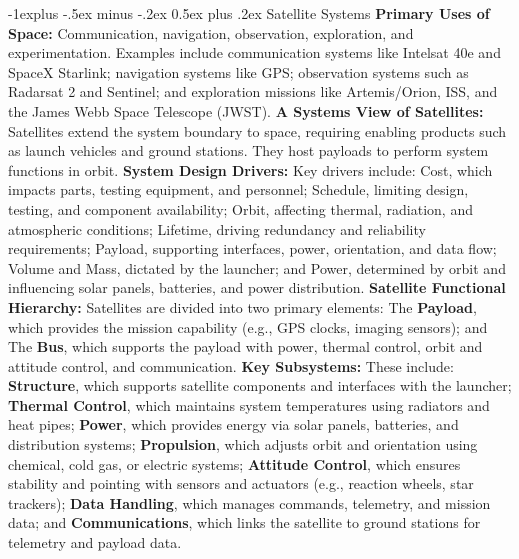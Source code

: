 \documentclass[letterpaper, 8pt]{extarticle}
\makeatletter
\renewcommand{\section}{\@startsection{section}{1}{0mm}%
                                {-1explus -.5ex minus -.2ex}%
                                {0.5ex plus .2ex}%
                                {\normalfont\small\bfseries}}
\makeatother
\begin{document}
\begin{multicols*}{5}
\section{Satellite Systems}
\noindent\textbf{Primary Uses of Space:} Communication, navigation, observation, exploration, and experimentation. Examples include communication systems like Intelsat 40e and SpaceX Starlink; navigation systems like GPS; observation systems such as Radarsat 2 and Sentinel; and exploration missions like Artemis/Orion, ISS, and the James Webb Space Telescope (JWST).
\noindent\textbf{A Systems View of Satellites:} Satellites extend the system boundary to space, requiring enabling products such as launch vehicles and ground stations. They host payloads to perform system functions in orbit.
\noindent\textbf{System Design Drivers:} Key drivers include:
Cost, which impacts parts, testing equipment, and personnel;
Schedule, limiting design, testing, and component availability;
Orbit, affecting thermal, radiation, and atmospheric conditions;
Lifetime, driving redundancy and reliability requirements;
Payload, supporting interfaces, power, orientation, and data flow;
Volume and Mass, dictated by the launcher;
and Power, determined by orbit and influencing solar panels, batteries, and power distribution.
\noindent\textbf{Satellite Functional Hierarchy:} Satellites are divided into two primary elements:
The \textbf{Payload}, which provides the mission capability (e.g., GPS clocks, imaging sensors); and
The \textbf{Bus}, which supports the payload with power, thermal control, orbit and attitude control, and communication.
\noindent\textbf{Key Subsystems:} These include:
\textbf{Structure}, which supports satellite components and interfaces with the launcher;
\textbf{Thermal Control}, which maintains system temperatures using radiators and heat pipes;
\textbf{Power}, which provides energy via solar panels, batteries, and distribution systems;
\textbf{Propulsion}, which adjusts orbit and orientation using chemical, cold gas, or electric systems;
\textbf{Attitude Control}, which ensures stability and pointing with sensors and actuators (e.g., reaction wheels, star trackers);
\textbf{Data Handling}, which manages commands, telemetry, and mission data; and
\textbf{Communications}, which links the satellite to ground stations for telemetry and payload data.


\end{multicols*}
\end{document}
